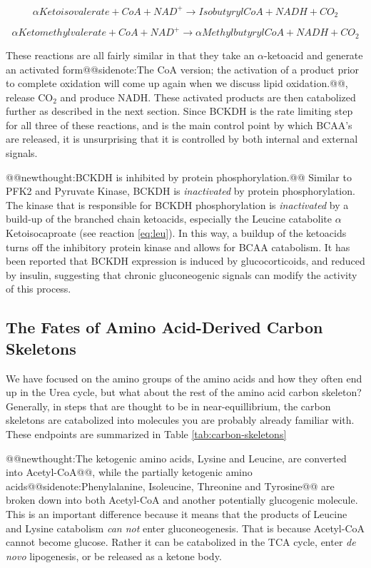 \documentclass{tufte-handout}
\makeatletter
\def\newthought#1{@@newthought:#1@@}
\def\sidenote#1{@@sidenote:#1@@}
\makeatother
\begin{document}
\begin{equation}\label{eq:val}
\alpha Ketoisovalerate + CoA + NAD^+ \rightarrow IsobutyrylCoA + NADH + CO_2
\end{equation}

\begin{equation}\label{eq:iso}
\alpha Ketomethylvalerate + CoA + NAD^+ \rightarrow \alpha MethylbutyrylCoA + NADH + CO_2
\end{equation}

These reactions are all fairly similar in that they take an $\alpha$-ketoacid and generate an activated form\sidenote{The CoA version; the activation of a product prior to complete oxidation will come up again when we discuss lipid oxidation.}, release CO$_2$ and produce NADH.  These activated products are then catabolized further as described in the next section.  Since BCKDH is the rate limiting step for all three of these reactions, and is the main control point by which BCAA's are released, it is unsurprising that it is controlled by both internal and external signals.

\newthought{BCKDH is inhibited by protein phosphorylation.}  Similar to PFK2 and Pyruvate Kinase, BCKDH is \emph{inactivated} by protein phosphorylation.  The kinase that is responsible for BCKDH phosphorylation is \emph{inactivated} by a build-up of the branched chain ketoacids, especially the Leucine catabolite $\alpha$ Ketoisocaproate (see reaction \ref{eq:leu}).  In this way, a buildup of the ketoacids turns off the inhibitory protein kinase and allows for BCAA catabolism.  It has been reported that BCKDH expression is induced by glucocorticoids, and reduced by insulin, suggesting that chronic gluconeogenic signals can modify the activity of this process. 

\subsection{The Fates of Amino Acid-Derived Carbon Skeletons}

We have focused on the amino groups of the amino acids and how they often end up in the Urea cycle, but what about the rest of the amino acid carbon skeleton?  Generally, in steps that are thought to be in near-equillibrium, the carbon skeletons are catabolized into molecules you are probably already familiar with.  These endpoints are summarized in Table \ref{tab:carbon-skeletons}

\newthought{The ketogenic amino acids, Lysine and Leucine, are converted into Acetyl-CoA}, while the partially ketogenic amino acids\sidenote{Phenylalanine, Isoleucine, Threonine and Tyrosine} are broken down into both Acetyl-CoA and another potentially glucogenic molecule.  This is an important difference because it means that the products of Leucine and Lysine catabolism \emph{can not} enter gluconeogenesis.  That is because Acetyl-CoA cannot become glucose.  Rather it can be catabolized in the TCA cycle, enter \textit{de novo} lipogenesis, or be released as a ketone body.
\end{document}
